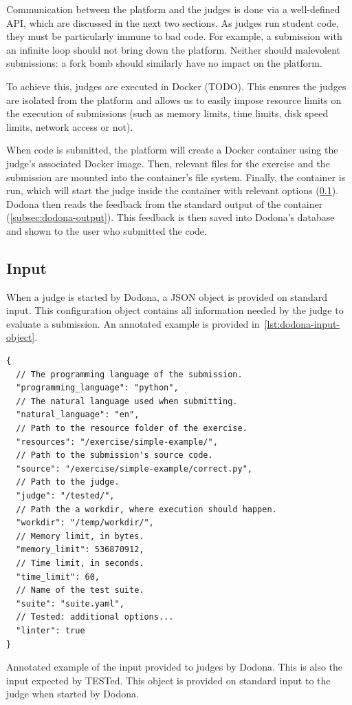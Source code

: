 \documentclass[../main]{subfiles}
\begin{document}
Communication between the platform and the judges is done via a well-defined API, which are discussed in the next two sections.
As judges run student code, they must be particularly immune to bad code.
For example, a submission with an infinite loop should not bring down the platform.
Neither should malevolent submissions: a fork bomb should similarly have no impact on the platform.

To achieve this, judges are executed in Docker (TODO).
This ensures the judges are isolated from the platform and allows us to easily impose resource limits on the execution of submissions (such as memory limits, time limits, disk speed limits, network access or not).

When code is submitted, the platform will create a Docker container using the judge's associated Docker image.
Then, relevant files for the exercise and the submission are mounted into the container's file system.
Finally, the container is run, which will start the judge inside the container with relevant options (\cref{subsec:dodona-input}).
Dodona then reads the feedback from the standard output of the container (\cref{subsec:dodona-output}).
This feedback is then saved into Dodona's database and shown to the user who submitted the code.

\subsection{Input}
\label{subsec:dodona-input}

When a judge is started by Dodona, a JSON object is provided on standard input.
This configuration object contains all information needed by the judge to evaluate a submission.
An annotated example is provided in~\cref{lst:dodona-input-object}.

\begin{listing}
    \begin{verbatim}
{
  // The programming language of the submission.
  "programming_language": "python",
  // The natural language used when submitting.
  "natural_language": "en",
  // Path to the resource folder of the exercise.
  "resources": "/exercise/simple-example/",
  // Path to the submission's source code.
  "source": "/exercise/simple-example/correct.py",
  // Path to the judge.
  "judge": "/tested/",
  // Path the a workdir, where execution should happen.
  "workdir": "/temp/workdir/",
  // Memory limit, in bytes.
  "memory_limit": 536870912,
  // Time limit, in seconds.
  "time_limit": 60,
  // Name of the test suite.
  "suite": "suite.yaml",
  // Tested: additional options...
  "linter": true
}
    \end{verbatim}
    \caption{
        Annotated example of the input provided to judges by Dodona.
        This is also the input expected by TESTed.
        This object is provided on standard input to the judge when started by Dodona.
    }
    \label{lst:dodona-input-object}
\end{listing}
\end{document}
